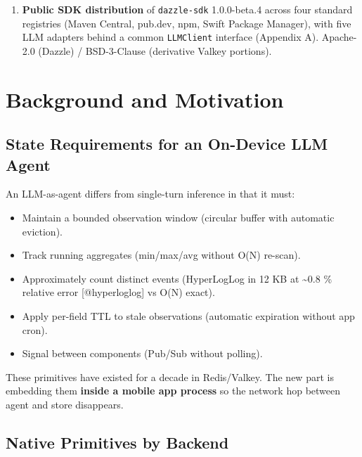 \begin{enumerate}
  \texttt{EM\_contains} 6.0× on Qwen 2.5 0.5B (0.105 → 0.630) and 6.7× on Qwen
  2.5 1.5B (0.110 → 0.735); the small-model-with- retrieval cell beats the
  large-model-without-retrieval cell on every factual metric. The result speaks
  to what becomes implementable when the right primitive is present, not to a
  microsecond delta over a competitor.
\item
  \textbf{Public SDK distribution} of \texttt{dazzle-sdk} 1.0.0-beta.4 across
  four standard registries (Maven Central, pub.dev, npm, Swift Package Manager),
  with five LLM adapters behind a common \texttt{LLMClient} interface (Appendix
  A). Apache-2.0 (Dazzle) / BSD-3-Clause (derivative Valkey portions).
\end{enumerate}

\section{Background and Motivation}\label{background-and-motivation}

\subsection{State Requirements for an On-Device LLM
Agent}\label{state-requirements-for-an-on-device-llm-agent}

An LLM-as-agent differs from single-turn inference in that it must:

\begin{itemize}
\tightlist
\item
  Maintain a bounded observation window (circular buffer with automatic
  eviction).
\item
  Track running aggregates (min/max/avg without O(N) re-scan).
\item
  Approximately count distinct events (HyperLogLog in 12 KB at
  \textasciitilde0.8 \% relative error {[}@hyperloglog{]} vs O(N) exact).
\item
  Apply per-field TTL to stale observations (automatic expiration without app
  cron).
\item
  Signal between components (Pub/Sub without polling).
\end{itemize}

These primitives have existed for a decade in Redis/Valkey. The new part is
embedding them \textbf{inside a mobile app process} so the network hop between
agent and store disappears.

\subsection{Native Primitives by Backend}\label{native-primitives-by-backend}

